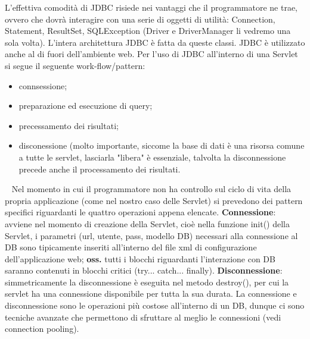 \newline
L'effettiva comodità di JDBC risiede nei vantaggi che il programmatore ne trae, ovvero che dovrà interagire con una serie di oggetti di utilità: Connection, Statement, ResultSet, SQLException (Driver e DriverManager li vedremo una sola volta). L'intera architettura JDBC è fatta da queste classi.\newline
\newline
JDBC è utilizzato anche al di fuori dell'ambiente web.\newline
\newline
Per l'uso di JDBC all'interno di una Servlet si segue il seguente work-flow/pattern:
\begin{itemize}
    \item connsessione;
    \item preparazione ed esecuzione di query;
    \item precessamento dei risultati;
    \item disconessione (molto importante, siccome la base di dati è una risorsa comune a tutte le servlet, lasciarla "libera" è essenziale, talvolta la disconnessione precede anche il processamento dei risultati.
\end{itemize}
\ \newline
Nel momento in cui il programmatore non ha controllo sul ciclo di vita della propria applicazione (come nel nostro caso delle Servlet) si prevedono dei pattern specifici riguardanti le quattro operazioni appena elencate.\newline
\newline
\textbf{Connessione}: avviene nel momento di creazione della Servlet, cioè nella funzione init() della Servlet, i parametri (url, utente, pass, modello DB) necessari alla connessione al DB sono tipicamente inseriti all'interno del file xml di configurazione dell'applicazione web;\newline
\textbf{oss.} tutti i blocchi riguardanti l'interazione con DB saranno contenuti in blocchi critici (try... catch... finally).\newline
\newline
\textbf{Disconnessione}: simmetricamente la disconnessione è eseguita nel metodo destroy(), per cui la servlet ha una connessione disponibile per tutta la sua durata.\newline
\newline
La connessione e disconnessione sono le operazioni più costose all'interno di un DB, dunque ci sono tecniche avanzate che permettono di sfruttare al meglio le connessioni (vedi connection pooling).\newline
